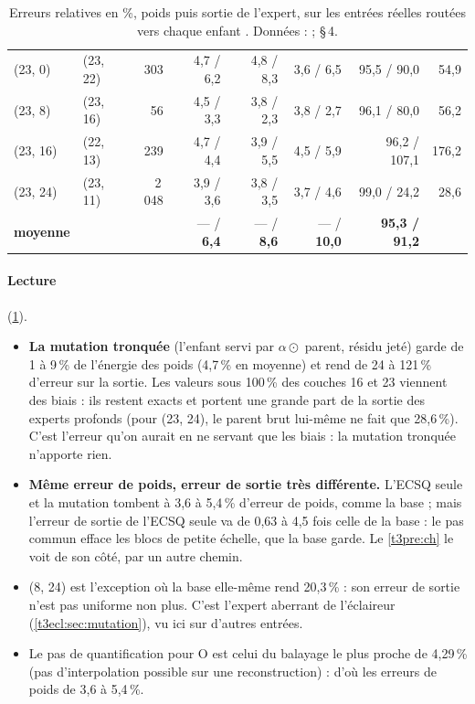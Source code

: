 \begin{table}[tbp]
\begin{tabular}{l l r r r r r r}
(23, 0) & (23, 22) & 303 & 4,7 / 6,2 & 4,8 / 8,3 & 3,6 / 6,5 & 95,5 / 90,0 & 54,9 \\
(23, 8) & (23, 16) & 56 & 4,5 / 3,3 & 3,8 / 2,3 & 3,8 / 2,7 & 96,1 / 80,0 & 56,2 \\
(23, 16) & (22, 13) & 239 & 4,7 / 4,4 & 3,9 / 5,5 & 4,5 / 5,9 & 96,2 / 107,1 & 176,2 \\
(23, 24) & (23, 11) & 2\,048 & 3,9 / 3,6 & 3,8 / 3,5 & 3,7 / 4,6 & 99,0 / 24,2 & 28,6 \\
\midrule
\textbf{moyenne} & & & — / \textbf{6,4} & — / \textbf{8,6} & — / \textbf{10,0} & \textbf{95,3 / 91,2} & \\
\bottomrule
\end{tabular}
\caption[La sortie des enfants, sur des entrées réelles]{Erreurs relatives en \%, poids puis sortie de l'expert, sur les entrées réelles routées vers chaque enfant \mes. Données :  ;  §\,4.}
\label{t3dup:tab:sortie}
\end{table}

\paragraph{Lecture} (\cref{t3dup:tab:sortie}).
\begin{itemize}
\item \textbf{La mutation tronquée} (l'enfant servi par $\alpha \odot$ parent, résidu jeté) garde de 1 à 9\,\% de l'énergie des poids (4,7\,\% en moyenne) et rend de 24 à 121\,\% d'erreur sur la sortie. Les valeurs sous 100\,\% des couches 16 et 23 viennent des biais : ils restent exacts et portent une grande part de la sortie des experts profonds (pour (23, 24), le parent brut lui-même ne fait que 28,6\,\%). C'est l'erreur qu'on aurait en ne servant que les biais : la mutation tronquée n'apporte rien.
\item \textbf{Même erreur de poids, erreur de sortie très différente.} L'ECSQ seule et la mutation tombent à 3,6 à 5,4\,\% d'erreur de poids, comme la base ; mais l'erreur de sortie de l'ECSQ seule va de 0,63 à 4,5 fois celle de la base : le pas commun efface les blocs de petite échelle, que la base garde. Le \cref{t3pre:ch} le voit de son côté, par un autre chemin.
\item (8, 24) est l'exception où la base elle-même rend 20,3\,\% : son erreur de sortie n'est pas uniforme non plus. C'est l'expert aberrant de l'éclaireur (\cref{t3ecl:sec:mutation}), vu ici sur d'autres entrées.
\item Le pas de quantification pour O est celui du balayage le plus proche de 4,29\,\% (pas d'interpolation possible sur une reconstruction) : d'où les erreurs de poids de 3,6 à 5,4\,\%.
\end{itemize}

